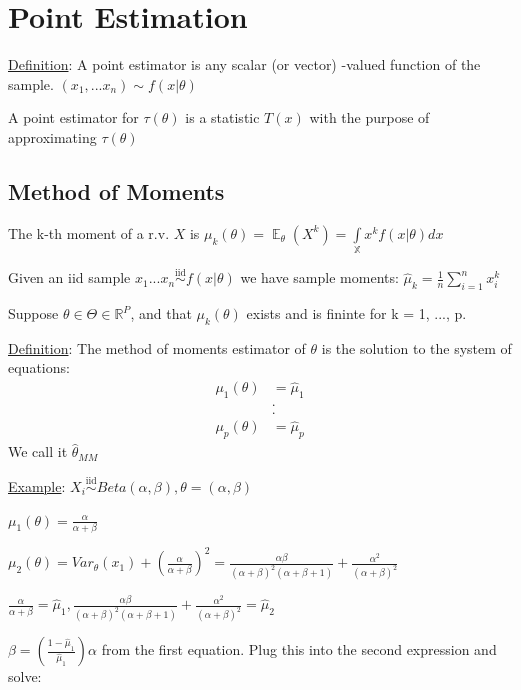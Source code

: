 \documentclass{article}
\DeclareMathOperator{\EX}{\mathbb{E}} %
\newcommand{\real}{\mathbb{R}} %
\let\Oldint=\int
\let\Oldsum=\sum
\renewcommand{\int}{\Oldint\limits}
\renewcommand{\sum}{\Oldsum\limits}
\newcommand{\iiddist}{\overset{\mathrm{iid}}{\sim}}
\begin{document}
\tableofcontents

\newpage

\section{Point Estimation}

\underline{Definition}: A point estimator is any scalar (or vector) -valued function of the sample. 
$(x_1, ... x_n) \sim f(x|\theta)$

A point estimator for $\tau(\theta)$ is a statistic $T(x)$ with the purpose of approximating $\tau(\theta)$

\subsection{Method of Moments}
The k-th moment of a r.v. $X$ is $\mu_k(\theta) = \EX_{\theta} (X^k) = \int_{\mathbb{X}} x^k f(x|\theta)dx$

Given an iid sample $x_1 ... x_n \iiddist f(x|\theta)$ we have sample moments: $\hat{\mu}_k = \frac{1}{n}\sum_{i=1}^{n} x_i^k$

Suppose $\theta \in \Theta \in \real^P$, and that $\mu_k(\theta)$ exists and is fininte for k = 1, ..., p.

\underline{Definition}: The method of moments estimator of $\theta$ is the solution to the system of equations:
\begin{align}
\mu_1(\theta) &= \hat{\mu}_1 \\
&. \\
&. \\
\mu_p(\theta) &= \hat{\mu}_p
\end{align}
We call it $\hat{\theta}_{MM}$

\underline{Example}: $X_i \iiddist Beta(\alpha, \beta), \theta = (\alpha, \beta)$

$\mu_1(\theta) = \frac{\alpha}{\alpha + \beta}$

$\mu_2(\theta) = Var_{\theta}(x_1) + \left(\frac{\alpha}{\alpha + \beta}\right)^2 = \frac{\alpha\beta}{(\alpha+\beta)^2 (\alpha + \beta + 1)} + \frac{\alpha^2}{(\alpha + \beta)^2}$

$\frac{\alpha}{\alpha + \beta} = \hat{\mu}_1, \frac{\alpha\beta}{(\alpha+\beta)^2 (\alpha + \beta + 1)} + \frac{\alpha^2}{(\alpha + \beta)^2} = \hat{\mu}_2$

$\beta = \left(\frac{1 - \hat{\mu}_1}{\hat{\mu}_1}\right)\alpha$ from the first equation. Plug this into the second expression and solve: 
\end{document}

